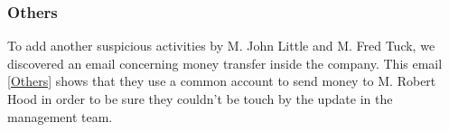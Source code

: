 \subsubsection{Others}
To add another suspicious activities by M. John Little and M. Fred Tuck, we discovered an email concerning money transfer inside the company. This email \ref{Others} shows that they use a common account to send money to M. Robert Hood in order to be sure they couldn't be touch by the update in the management team.